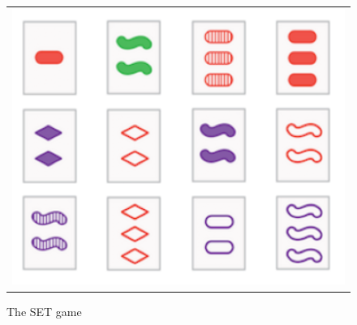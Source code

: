 

\begin{figure}
	\vskip-5pt
	\begin{tabular}{c}
		\includegraphics[width=.25\textwidth]{figures/set_example}\\[-5pt]
	\end{tabular}
	\caption{\footnotesize The SET game}\label{fig:set_example}
\end{figure}

